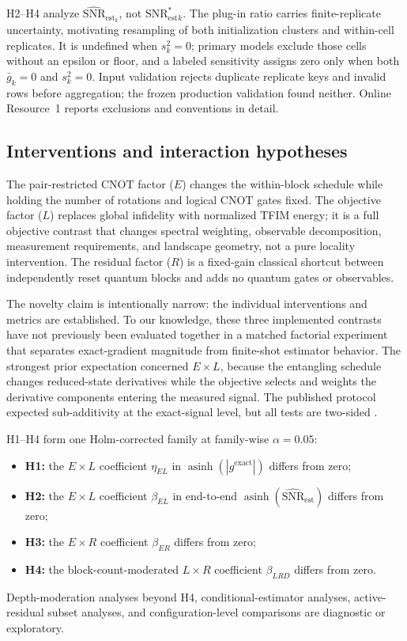 \documentclass[pdflatex,sn-mathphys-num,Numbered]{sn-jnl}
\newcommand{\snrstar}{\mathrm{SNR}^{*}_{\mathrm{est}}}
\newcommand{\snrest}{\widehat{\mathrm{SNR}}_{\mathrm{est}}}
\begin{document}
H2--H4 analyze $\snrest_k$, not $\snrstar_k$. The plug-in ratio carries finite-replicate uncertainty, motivating resampling of both initialization clusters and within-cell replicates. It is undefined when $s_k^2=0$; primary models exclude those cells without an epsilon or floor, and a labeled sensitivity assigns zero only when both $\bar g_k=0$ and $s_k^2=0$. Input validation rejects duplicate replicate keys and invalid rows before aggregation; the frozen production validation found neither. Online Resource~1 reports exclusions and conventions in detail.

\subsection{Interventions and interaction hypotheses}

The pair-restricted CNOT factor ($E$) changes the within-block schedule while holding the number of rotations and logical CNOT gates fixed. The objective factor ($L$) replaces global infidelity with normalized TFIM energy; it is a full objective contrast that changes spectral weighting, observable decomposition, measurement requirements, and landscape geometry, not a pure locality intervention. The residual factor ($R$) is a fixed-gain classical shortcut between independently reset quantum blocks and adds no quantum gates or observables.

The novelty claim is intentionally narrow: the individual interventions and metrics are established. To our knowledge, these three implemented contrasts have not previously been evaluated together in a matched factorial experiment that separates exact-gradient magnitude from finite-shot estimator behavior. The strongest prior expectation concerned $E\times L$, because the entangling schedule changes reduced-state derivatives while the objective selects and weights the derivative components entering the measured signal. The published protocol expected sub-additivity at the exact-signal level, but all tests are two-sided \cite{shen2026gradient}.

H1--H4 form one Holm-corrected family at family-wise $\alpha=0.05$:
\begin{itemize}
\item \textbf{H1:} the $E\times L$ coefficient $\eta_{EL}$ in $\operatorname{asinh}(|g^{\mathrm{exact}}|)$ differs from zero;
\item \textbf{H2:} the $E\times L$ coefficient $\beta_{EL}$ in end-to-end $\operatorname{asinh}(\snrest)$ differs from zero;
\item \textbf{H3:} the $E\times R$ coefficient $\beta_{ER}$ differs from zero;
\item \textbf{H4:} the block-count-moderated $L\times R$ coefficient $\beta_{LRD}$ differs from zero.
\end{itemize}
Depth-moderation analyses beyond H4, conditional-estimator analyses, active-residual subset analyses, and configuration-level comparisons are diagnostic or exploratory.
\end{document}
